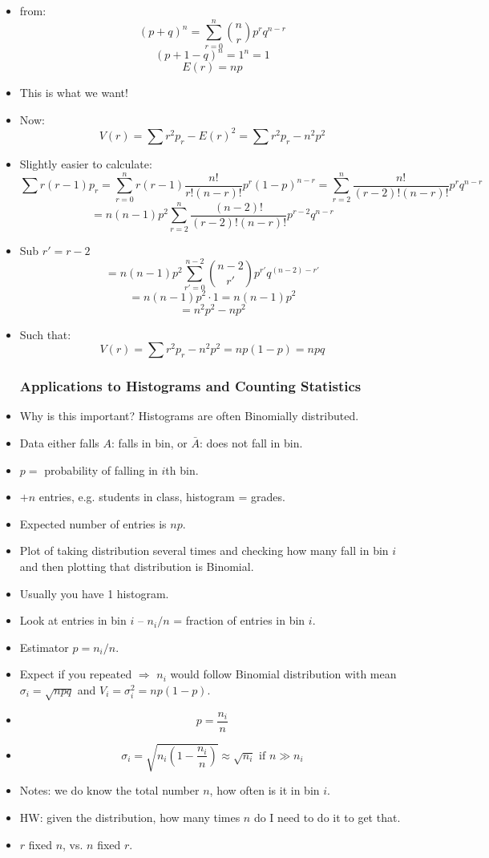 \begin{itemize}
      \item from:
            \[ (p+q)^n = \sum_{r=0}^n \binom{n}{r} p^r q^{n-r} \]
            \[ (p+1-q)^n = 1^n = 1 \]
            \[ E(r) = np \]
      \item This is what we want!
      \item Now:
            \[ V(r) = \sum r^2 p_r - E(r)^2 = \sum r^2 p_r - n^2 p^2 \]
      \item Slightly easier to calculate:
            \[ \sum r(r-1) p_r = \sum_{r=0}^n r(r-1) \frac{n!}{r!(n-r)!} p^r (1-p)^{n-r} = \sum_{r=2}^n \frac{n!}{(r-2)!(n-r)!} p^r q^{n-r} \]
            \[ = n(n-1) p^2 \sum_{r=2}^n \frac{(n-2)!}{(r-2)!(n-r)!} p^{r-2} q^{n-r} \]
      \item Sub $r' = r-2$
            \[ = n(n-1) p^2 \sum_{r'=0}^{n-2} \binom{n-2}{r'} p^{r'} q^{(n-2)-r'} \]
            \[ = n(n-1)p^2 \cdot 1 = n(n-1)p^2 \]
            \[ = n^2 p^2 - np^2 \]
      \item Such that:
            \[ \boxed{V(r) = \sum r^2 p_r - n^2 p^2 } = np (1 - p) = npq \]

            \subsubsection*{Applications to Histograms and Counting Statistics}

      \item Why is this important? Histograms are often Binomially distributed.
      \item Data either falls $A$: falls in bin, or $\bar{A}$: does not fall in bin.
      \item $p =$ probability of falling in $i$th bin.
      \item $+n$ entries, e.g. students in class, histogram = grades.
      \item Expected number of entries is $np$.
      \item Plot of taking distribution several times and checking how many fall in bin $i$ and then plotting that distribution is Binomial.
      \item Usually you have 1 histogram.
      \item Look at entries in bin $i$ -- $n_i/n$ = fraction of entries in bin $i$.
      \item Estimator $p = n_i/n$.
      \item Expect if you repeated $\Rightarrow$ $n_i$ would follow Binomial distribution with mean $\sigma_i = \sqrt{n p q}$ and $V_i = \sigma_i^2 = np (1 - p)$.
      \item \[ p = \frac{n_i}{n} \]
      \item \[ \boxed{\sigma_i = \sqrt{n_i \left(1 - \frac{n_i}{n}\right)}} \approx \sqrt{n_i} \text{ if } n \gg n_i \]

      \item Notes: we do know the total number $n$, how often is it in bin $i$.
      \item HW: given the distribution, how many times $n$ do I need to do it to get that.
      \item $r$ fixed $n$, vs. $n$ fixed $r$.
\end{itemize}
